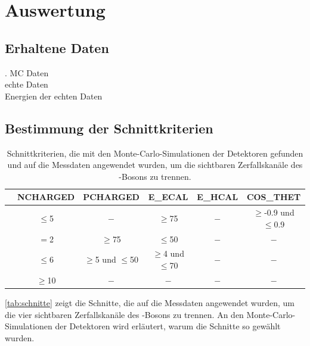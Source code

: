 \section{Auswertung}
\subsection{Erhaltene Daten}.
MC Daten \\
echte Daten \\
Energien der echten Daten


\subsection{Bestimmung der Schnittkriterien}

\begin{table}[H]
    \caption{Schnittkriterien, die mit den Monte-Carlo-Simulationen der Detektoren gefunden und
    auf die Messdaten angewendet wurden, um die sichtbaren Zerfallskanäle des \Z-Bosons zu trennen.}
    \begin{center}
        \begin{tabular}{|c||c|c|c|c|c|}
            \hline
        	& NCHARGED	& PCHARGED				& E\_ECAL				& E\_HCAL	& COS\_THET						\\ \hline\hline
   \Zee		& $\leq$5	& $-$					& $\geq$75				& $-$		& $\geq$-0.9 und $\leq$0.9		\\ \hline
   \Zmm		& $=$2		& $\geq$75				& $\leq$50				& $-$		& $-$							\\ \hline
   \Ztt		& $\leq$6	& $\geq$5 und $\leq$50	& $\geq$4 und $\leq$70	& $-$		& $-$							\\ \hline
   \Zqq		& $\geq$10	& $-$					& $-$					& $-$		& $-$							\\ \hline

        \end{tabular}
    \end{center}
    \label{tab:schnitte}
\end{table}

\autoref{tab:schnitte} zeigt die Schnitte,
die auf die Messdaten angewendet wurden,
um die vier sichtbaren Zerfallskanäle des \Z-Bosons zu trennen.
An den Monte-Carlo-Simulationen der Detektoren wird erläutert, warum die Schnitte so gewählt wurden.

